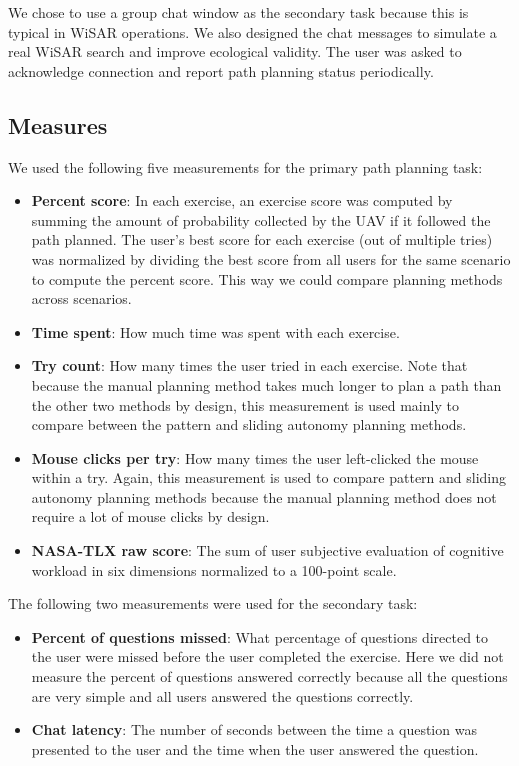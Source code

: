 We chose to use a group chat window as the secondary task because this is typical in WiSAR operations. We also designed the chat messages to simulate a real WiSAR search and improve ecological validity. The user was asked to acknowledge connection and report path planning status periodically.

\subsection{Measures}

We used the following five measurements for the primary path planning task:

\begin{itemize}
\item \textbf{Percent score}: In each exercise, an exercise score was computed by summing the amount of probability collected by the UAV if it followed the path planned. The user's best score for each exercise (out of multiple tries) was normalized by dividing the best score from all users for the same scenario to compute the percent score. This way we could compare planning methods across scenarios.
\item \textbf{Time spent}: How much time was spent with each exercise.
\item \textbf{Try count}: How many times the user tried in each exercise. Note that because the manual planning method takes much longer to plan a path than the other two methods by design, this measurement is used mainly to compare between the pattern and sliding autonomy planning methods.
\item \textbf{Mouse clicks per try}: How many times the user left-clicked the mouse within a try. Again, this measurement is used to compare pattern and sliding autonomy planning methods because the manual planning method does not require a lot of mouse clicks by design.
\item \textbf{NASA-TLX raw score}: The sum of user subjective evaluation of cognitive workload in six dimensions normalized to a 100-point scale. 
\end{itemize}

The following two measurements were used for the secondary task:
\begin{itemize}
\item \textbf{Percent of questions missed}: What percentage of questions directed to the user were missed before the user completed the exercise. Here we did not measure the percent of questions answered correctly because all the questions are very simple and all users answered the questions correctly.
\item \textbf{Chat latency}: The number of seconds between the time a question was presented to the user and the time when the user answered the question.
\end{itemize}

